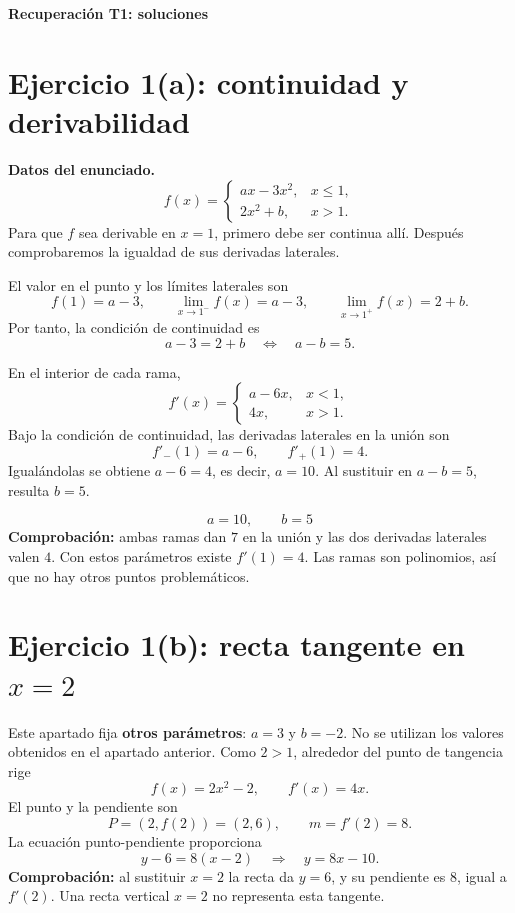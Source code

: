 \documentclass[11pt,a4paper]{article}
\begin{document}
{\Large\bfseries Recuperación T1: soluciones}

\section*{Ejercicio 1(a): continuidad y derivabilidad}
\textbf{Datos del enunciado.}
\[
f(x)=
\begin{cases}
ax-3x^2,& x\leq1,\\
2x^2+b,& x>1.
\end{cases}
\]
Para que \(f\) sea derivable en \(x=1\), primero debe ser continua allí.
Después comprobaremos la igualdad de sus derivadas laterales.

El valor en el punto y los límites laterales son
\[
f(1)=a-3,\qquad
\lim_{x\to1^-}f(x)=a-3,\qquad
\lim_{x\to1^+}f(x)=2+b.
\]
Por tanto, la condición de continuidad es
\[
a-3=2+b \quad\Longleftrightarrow\quad a-b=5.
\]

En el interior de cada rama,
\[
f'(x)=
\begin{cases}
a-6x,& x<1,\\
4x,& x>1.
\end{cases}
\]
Bajo la condición de continuidad, las derivadas laterales en la unión son
\[
f'_-(1)=a-6,\qquad f'_+(1)=4.
\]
Igualándolas se obtiene \(a-6=4\), es decir, \(a=10\). Al sustituir en
\(a-b=5\), resulta \(b=5\).

\[
\boxed{a=10,\qquad b=5}
\]
\textbf{Comprobación:} ambas ramas dan \(7\) en la unión y las dos
derivadas laterales valen \(4\). Con estos parámetros existe \(f'(1)=4\).
Las ramas son polinomios, así que no hay otros puntos problemáticos.

\clearpage
\section*{Ejercicio 1(b): recta tangente en \(x=2\)}
Este apartado fija \textbf{otros parámetros}: \(a=3\) y \(b=-2\).
No se utilizan los valores obtenidos en el apartado anterior.
Como \(2>1\), alrededor del punto de tangencia rige
\[
f(x)=2x^2-2,\qquad f'(x)=4x.
\]
El punto y la pendiente son
\[
P=(2,f(2))=(2,6),\qquad m=f'(2)=8.
\]
La ecuación punto-pendiente proporciona
\[
y-6=8(x-2)
\quad\Longrightarrow\quad
\boxed{y=8x-10}.
\]
\textbf{Comprobación:} al sustituir \(x=2\) la recta da \(y=6\), y su
pendiente es \(8\), igual a \(f'(2)\). Una recta vertical \(x=2\) no
representa esta tangente.
\end{document}
